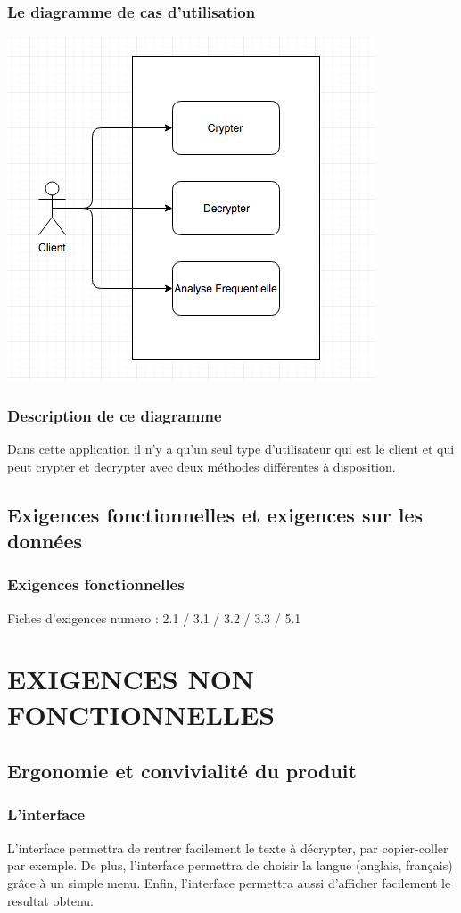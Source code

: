 \documentclass[a4]{article}
\begin{document}
			\subsubsection {Le diagramme de cas d'utilisation} 
				\includegraphics[scale=0.5]{dia.png} 
			\subsubsection {Description de ce diagramme}
				Dans cette application il n'y a qu'un seul type d'utilisateur qui est le client 
				et qui peut crypter et decrypter avec deux méthodes différentes à disposition.
		\subsection{Exigences fonctionnelles et exigences sur les données}
			\subsubsection {Exigences fonctionnelles}
				Fiches d'exigences numero : 2.1 / 3.1 / 3.2 / 3.3 / 5.1
	\section{EXIGENCES NON FONCTIONNELLES}
		\subsection{Ergonomie et convivialité du produit}
			\subsubsection {L'interface}
				L'interface permettra de rentrer facilement le texte à décrypter, par copier-coller par exemple.
				De plus, l'interface permettra de choisir la langue (anglais, français) grâce à un simple menu.
				Enfin, l'interface permettra aussi d'afficher facilement le resultat obtenu.
\end{document}
